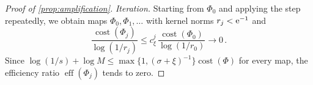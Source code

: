 \begin{proof}[Proof of \cref{prop:amplification}]
\emph{Iteration.} Starting from $\Phi_0$ and applying the step repeatedly, we obtain maps
$\Phi_0,\Phi_1,\dots$ with kernel norms $r_j<\mathrm{e}^{-1}$ and
\begin{equation*}
  \frac{\operatorname{cost}(\Phi_j)}{\log(1/r_j)}\le c_\xi^j\,\frac{\operatorname{cost}(\Phi_0)}{\log(1/r_0)}
  \longrightarrow0\,.
\end{equation*}
Since $\log(1/s)+\log M\le\max\{1,(\sigma+\xi)^{-1}\}\operatorname{cost}(\Phi)$ for every map, the
efficiency ratio $\operatorname{eff}(\Phi_j)$ tends to zero.
\end{proof}
